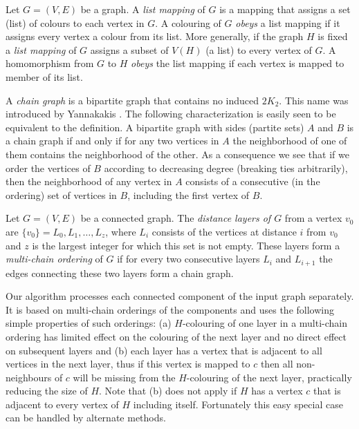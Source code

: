 \documentclass[12pt]{llncs}
\begin{document}
Let $G = (V, E)$ be a graph.  A \emph{list mapping} of $G$ is a
mapping that assigns a set (list) of colours to each vertex in $G$.
A colouring of $G$ \emph{obeys} a list mapping if it assigns every
vertex a colour from its list. More generally, if the graph $H$ is fixed a
{\em list mapping} of $G$ assigns a subset of $V(H)$ (a list) to every vertex
of $G$. A homomorphism from $G$ to $H$ {\em obeys} the list mapping if each
vertex is mapped to member of its list.

A {\em chain graph} is a bipartite graph that contains no induced $2K_2$.
This name was introduced by Yannakakis \cite{Yann}. The following
characterization is easily seen to be equivalent to the definition. A
bipartite graph with sides (partite sets) $A$ and $B$ is a chain graph if and
only if for any two vertices in $A$ the neighborhood of one of them contains
the neighborhood of the other. As a consequence we see that if we order the
vertices of $B$ according to decreasing degree (breaking ties arbitrarily),
then the neighborhood of any vertex in $A$ consists of 
a consecutive (in the ordering) set of vertices in $B$, including the first vertex of $B$.

Let $G = (V, E)$ be a connected graph. The {\em distance layers of
$G$} from a vertex $v_0$ are $\{v_0\}=L_0,L_1,\ldots,L_z$, where $L_i$
consists of the vertices at distance $i$ from $v_0$ and $z$ is the
largest integer for which this set is not empty. These layers form
a \emph{multi-chain ordering} of $G$ if for every two consecutive layers $L_i$
and $L_{i+1}$ the edges connecting these two layers form a chain graph.

Our algorithm processes each connected component of the input graph
separately. It is based on multi-chain orderings of the components and uses the
following simple properties of such orderings: (a) $H$-colouring of one
layer in a multi-chain ordering has limited effect on the colouring
of the next layer and no direct effect on subsequent layers and (b)
each layer has a vertex that is adjacent to all vertices in the next
layer, thus if this vertex is mapped to $c$ then all non-neighbours of $c$ will be
missing from the $H$-colouring of the next layer, practically reducing the
size of $H$. Note that (b) does not apply if $H$ has a vertex $c$ that is
adjacent to every vertex of $H$ including itself. Fortunately this easy
special case can be handled by alternate methods.
\end{document}
